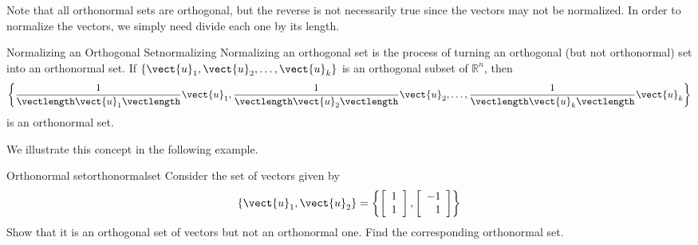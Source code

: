 Note that all orthonormal sets are orthogonal, but the reverse is not
necessarily true since the vectors may not be normalized. In order to
normalize the vectors, we simply need divide each one by its length.

\begin{definition}{Normalizing an Orthogonal Set}{normalizing}
Normalizing an orthogonal set is the process of 
turning an orthogonal (but not orthonormal) set into
an orthonormal set.
If $\{ \vect{u}_1, \vect{u}_2, \ldots, \vect{u}_k\}$
is an orthogonal subset of $\mathbb{R}^n$, 
then 
\[ \left\{
\frac{1}{\vectlength\vect{u}_1\vectlength}\vect{u}_1,
\frac{1}{\vectlength\vect{u}_2\vectlength}\vect{u}_2, \ldots,
\frac{1}{\vectlength\vect{u}_k\vectlength}\vect{u}_k \right\}
\]
is an orthonormal set.
\end{definition}

We illustrate this concept in the following example. 

\begin{example}{Orthonormal set}{orthonormalset}
Consider the set of vectors  given by 
\[
\left\{ \vect{u}_1, \vect{u}_2 \right\} = \left\{
\left[
\begin{array}{c}
1 \\
1 
\end{array}
\right], 
\left[
\begin{array}{r}
-1 \\
1
\end{array}
\right]
\right\}
\]
Show that it is an orthogonal set of vectors  but not an orthonormal one. Find the corresponding orthonormal set. 
\end{example}


